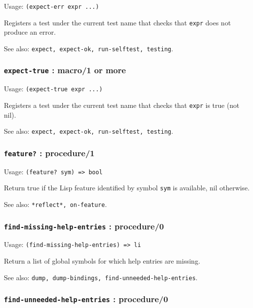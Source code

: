 \documentclass[
]{article}
\newcommand{\passthrough}[1]{#1}
\begin{document}
Usage: \passthrough{\lstinline!(expect-err expr ...)!}

Registers a test under the current test name that checks that
\passthrough{\lstinline!expr!} does not produce an error.

See also:
\passthrough{\lstinline!expect, expect-ok, run-selftest, testing!}.

\hypertarget{expect-true-macro1-or-more}{%
\subsubsection{\texorpdfstring{\texttt{expect-true} : macro/1 or
more}{expect-true : macro/1 or more}}\label{expect-true-macro1-or-more}}

Usage: \passthrough{\lstinline!(expect-true expr ...)!}

Registers a test under the current test name that checks that
\passthrough{\lstinline!expr!} is true (not nil).

See also:
\passthrough{\lstinline!expect, expect-ok, run-selftest, testing!}.

\hypertarget{feature-procedure1}{%
\subsubsection{\texorpdfstring{\texttt{feature?} :
procedure/1}{feature? : procedure/1}}\label{feature-procedure1}}

Usage: \passthrough{\lstinline!(feature? sym) => bool!}

Return true if the Lisp feature identified by symbol
\passthrough{\lstinline!sym!} is available, nil otherwise.

See also: \passthrough{\lstinline!*reflect*, on-feature!}.

\hypertarget{find-missing-help-entries-procedure0}{%
\subsubsection{\texorpdfstring{\texttt{find-missing-help-entries} :
procedure/0}{find-missing-help-entries : procedure/0}}\label{find-missing-help-entries-procedure0}}

Usage: \passthrough{\lstinline!(find-missing-help-entries) => li!}

Return a list of global symbols for which help entries are missing.

See also:
\passthrough{\lstinline!dump, dump-bindings, find-unneeded-help-entries!}.

\hypertarget{find-unneeded-help-entries-procedure0}{%
\subsubsection{\texorpdfstring{\texttt{find-unneeded-help-entries} :
procedure/0}{find-unneeded-help-entries : procedure/0}}\label{find-unneeded-help-entries-procedure0}}
\end{document}
